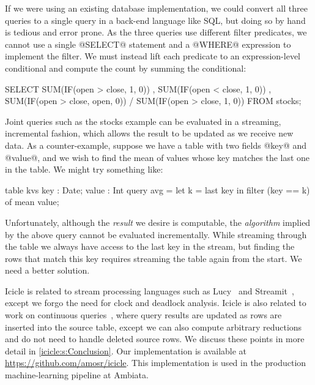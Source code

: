If we were using an existing database implementation, we could convert all three queries to a single query in a back-end language like SQL, but doing so by hand is tedious and error prone.
As the three queries use different filter predicates, we cannot use a single @SELECT@ statement and a @WHERE@ expression to implement the filter.
We must instead lift each predicate to an expression-level conditional and compute the count by summing the conditional:

\begin{sql}
  SELECT SUM(IF(open > close, 1,    0))
       , SUM(IF(open < close, 1,    0))
       , SUM(IF(open > close, open, 0))
       / SUM(IF(open > close, 1,    0))
  FROM stocks;
\end{sql}


Joint queries such as the stocks example can be evaluated in a streaming, incremental fashion, which allows the result to be updated as we receive new data.
As a counter-example, suppose we have a table with two fields @key@ and @value@, and we wish to find the mean of values whose key matches the last one in the table.
We might try something like:

\begin{icicle}
  table kvs { key : Date; value : Int }
  query avg = let k = last key
              in  filter (key == k) of mean value;
\end{icicle}

Unfortunately, although the \emph{result} we desire is computable, the \emph{algorithm} implied by the above query cannot be evaluated incrementally.
While streaming through the table we always have access to the last key in the stream, but finding the rows that match this key requires streaming the table again from the start.
We need a better solution.


Icicle is related to stream processing languages such as Lucy~\cite{mandel2010lucy} and Streamit~\cite{thies2002streamit}, except we forgo the need for clock and deadlock analysis.
Icicle is also related to work on continuous queries~\cite{arasu2003cql}, where query results are updated as rows are inserted into the source table, except we can also compute arbitrary reductions and do not need to handle deleted source rows.
We discuss these points in more detail in \cref{icicle:s:Conclusion}.
Our implementation is available at \url{https://github.com/amosr/icicle}.
This implementation is used in the production machine-learning pipeline at Ambiata.
